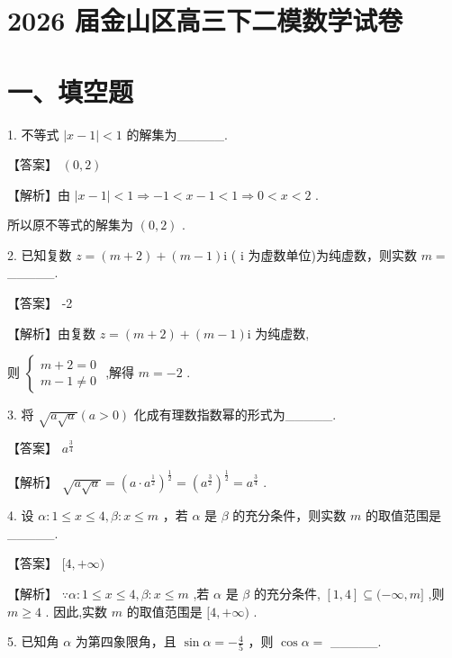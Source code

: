 \documentclass[10pt]{article}
\begin{document}
\section*{2026 届金山区高三下二模数学试卷}

\section*{一、填空题}

1. 不等式 \(\left| {x - 1}\right|  < 1\) 的解集为\_\_\_\_\_.

【答案】 \(\left( {0,2}\right)\)

【解析】由 \(\left| {x - 1}\right|  < 1 \Rightarrow   - 1 < x - 1 < 1 \Rightarrow  0 < x < 2\) .

所以原不等式的解集为 \(\left( {0,2}\right)\) .

2. 已知复数 \(z = \left( {m + 2}\right)  + \left( {m - 1}\right) \mathrm{i}\) ( \(\mathrm{i}\) 为虚数单位)为纯虚数，则实数 \(m =\) \_\_\_\_\_.

【答案】 -2

【解析】由复数 \(z = \left( {m + 2}\right)  + \left( {m - 1}\right) \mathrm{i}\) 为纯虚数,

则 \(\left\{  \begin{array}{l} m + 2 = 0 \\  m - 1 \neq  0 \end{array}\right.\) ,解得 \(m =  - 2\) .

3. 将 \(\sqrt{a\sqrt{a}}\left( {a > 0}\right)\) 化成有理数指数幂的形式为\_\_\_\_\_.

【答案】 \({a}^{\frac{3}{4}}\)

【解析】 \(\sqrt{a\sqrt{a}} = {\left( a \cdot  {a}^{\frac{1}{2}}\right) }^{\frac{1}{2}} = {\left( {a}^{\frac{3}{2}}\right) }^{\frac{1}{2}} = {a}^{\frac{3}{4}}\) .

4. 设 \(\alpha  : 1 \leq  x \leq  4,\beta  : x \leq  m\) ，若 \(\alpha\) 是 \(\beta\) 的充分条件，则实数 \(m\) 的取值范围是\_\_\_\_\_.

【答案】 \(\lbrack 4, + \infty )\)

【解析】 \(\because \alpha  : 1 \leq  x \leq  4,\beta  : x \leq  m\) ,若 \(\alpha\) 是 \(\beta\) 的充分条件, \(\left\lbrack  {1,4}\right\rbrack   \subseteq  ( - \infty ,m\rbrack\) ,则 \(m \geq  4\) . 因此,实数 \(m\) 的取值范围是 \(\lbrack 4, + \infty )\) .

5. 已知角 \(\alpha\) 为第四象限角，且 \(\sin \alpha  =  - \frac{4}{5}\) ，则 \(\cos \alpha  =\) \_\_\_\_\_.
\end{document}
